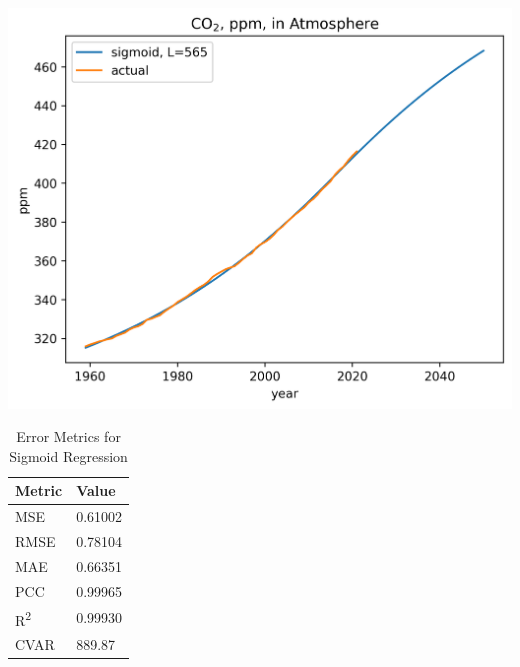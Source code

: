 \documentclass{mcmthesis}
\begin{document}
    \begin{table}[h]
        \begin{minipage}{0.7\linewidth}
            \centering
            \includegraphics[width=\textwidth]{co2_sigm_565}%
            \label{fig:co2_logi}
        \end{minipage}%
        \begin{minipage}{0.3\linewidth}
            \centering
            \begin{tabular}{ll}
                \toprule
                Metric               & Value   \\
                \midrule
                MSE                  & 0.61002 \\
                RMSE                 & 0.78104 \\
                MAE                  & 0.66351 \\
                PCC                  & 0.99965 \\
                R\textsuperscript{2} & 0.99930 \\
                CVAR                 & 889.87  \\
                \bottomrule
            \end{tabular}
            \vspace{8pt}
            \caption{Error Metrics for Sigmoid Regression}
            \label{tab:co2_logi_err}
        \end{minipage}
    \end{table}
\end{document}
